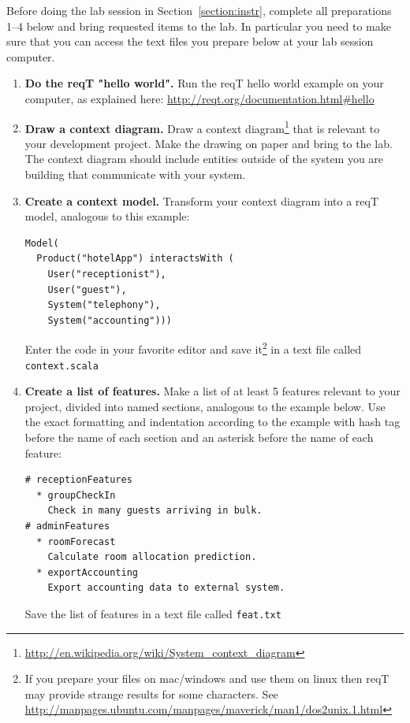 \documentclass[11pt]{article}
\begin{document}
\begin{framed} \noindent Before doing the lab session in Section~\ref{section:instr}, complete all preparations 1--4 below and bring requested items to the lab. In particular you need to make sure that you can access the text files you prepare below at your lab session computer.
\end{framed}

\begin{enumerate}
\item {\bf Do the reqT "hello world".} Run the reqT hello world example on your computer, as explained here: \newline \url{http://reqt.org/documentation.html\#hello}
\item {\bf Draw a context diagram.} Draw a context diagram\footnote{\url{http://en.wikipedia.org/wiki/System_context_diagram}} that  is relevant to your development project. Make the drawing on paper and bring to the lab. The context diagram should include entities outside of the system you are building that communicate with your system. 
\item {\bf Create a context model.} Transform your context diagram into a reqT model, analogous to this  example: 
{\footnotesize\begin{verbatim}
Model(
  Product("hotelApp") interactsWith (
    User("receptionist"), 
    User("guest"), 
    System("telephony"), 
    System("accounting")))
\end{verbatim}}
Enter the code in your favorite editor and save it\footnote{If you prepare your files on mac/windows and use them on linux then reqT may provide strange results for some characters. See \url{http://manpages.ubuntu.com/manpages/maverick/man1/dos2unix.1.html}} in a text file called \verb+context.scala+
\item {\bf Create a list of features.} Make a list of at least 5 features relevant to your project, divided into named sections, analogous to the example below. Use the exact formatting and indentation according to the example with hash tag before the name of each section and an asterisk before the name of each feature: 
{\scriptsize\begin{verbatim}
# receptionFeatures
  * groupCheckIn
    Check in many guests arriving in bulk.
# adminFeatures
  * roomForecast
    Calculate room allocation prediction.
  * exportAccounting
    Export accounting data to external system.
\end{verbatim}}
Save the list of features in a text file called \verb+feat.txt+  
\end{enumerate}
\clearpage\newpage
\end{document}
